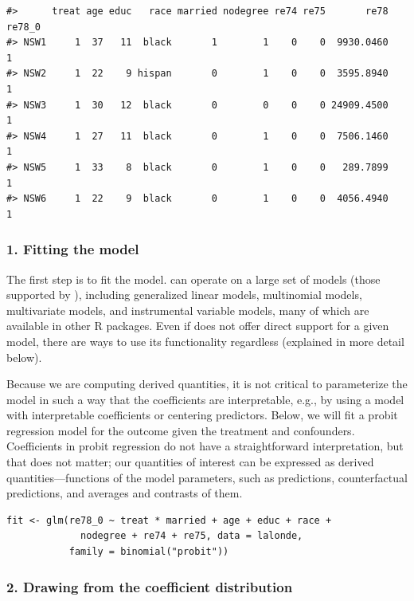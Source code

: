 \begin{verbatim}
#>      treat age educ   race married nodegree re74 re75       re78 re78_0
#> NSW1     1  37   11  black       1        1    0    0  9930.0460      1
#> NSW2     1  22    9 hispan       0        1    0    0  3595.8940      1
#> NSW3     1  30   12  black       0        0    0    0 24909.4500      1
#> NSW4     1  27   11  black       0        1    0    0  7506.1460      1
#> NSW5     1  33    8  black       0        1    0    0   289.7899      1
#> NSW6     1  22    9  black       0        1    0    0  4056.4940      1
\end{verbatim}

\hypertarget{fitting-the-model}{%
\subsubsection{1. Fitting the model}\label{fitting-the-model}}

The first step is to fit the model.  can operate on a large set of models (those supported by ), including generalized linear models, multinomial models, multivariate models, and instrumental variable models, many of which are available in other R packages. Even if  does not offer direct support for a given model, there are ways to use its functionality regardless (explained in more detail below).

Because we are computing derived quantities, it is not critical to parameterize the model in such a way that the coefficients are interpretable, e.g., by using a model with interpretable coefficients or centering predictors. Below, we will fit a probit regression model for the outcome given the treatment and confounders. Coefficients in probit regression do not have a straightforward interpretation, but that does not matter; our quantities of interest can be expressed as derived quantities---functions of the model parameters, such as predictions, counterfactual predictions, and averages and contrasts of them.

\begin{verbatim}
fit <- glm(re78_0 ~ treat * married + age + educ + race +
             nodegree + re74 + re75, data = lalonde,
           family = binomial("probit"))
\end{verbatim}

\hypertarget{drawing-from-the-coefficient-distribution}{%
\subsubsection{2. Drawing from the coefficient distribution}\label{drawing-from-the-coefficient-distribution}}

